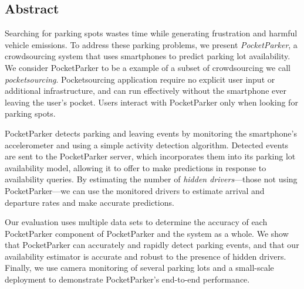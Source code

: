 \subsection*{Abstract}

Searching for parking spots wastes time while generating frustration and
harmful vehicle emissions. To address these parking problems, we present
\textit{PocketParker}, a crowdsourcing system that uses smartphones to
predict parking lot availability. We consider PocketParker to be a example of
a subset of crowdsourcing we call \textit{pocketsourcing}. Pocketsourcing
application require no explicit user input or additional infrastructure, and
can run effectively without the smartphone ever leaving the user's pocket.
Users interact with PocketParker only when looking for parking spots.

PocketParker detects parking and leaving events by monitoring the
smartphone's accelerometer and using a simple activity detection algorithm.
Detected events are sent to the PocketParker server, which incorporates them
into its parking lot availability model, allowing it to offer to make
predictions in response to availability queries. By estimating the number of
\textit{hidden drivers}---those not using PocketParker---we can use the
monitored drivers to estimate arrival and departure rates and make accurate
predictions.

Our evaluation uses multiple data sets to determine the accuracy of each
PocketParker component of PocketParker and the system as a whole. We show
that PocketParker can accurately and rapidly detect parking events, and that
our availability estimator is accurate and robust to the presence of hidden
drivers. Finally, we use camera monitoring of several parking lots and a
small-scale deployment to demonstrate PocketParker's end-to-end performance. 
